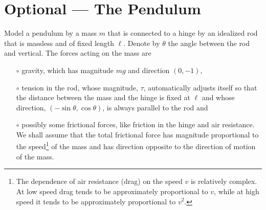 \section{Optional --- The Pendulum}\label{sec:Pendulum}

Model a pendulum by a mass $m$ that is connected to a hinge by 
an idealized rod that is massless and of fixed length $\ell$. Denote 
by $\theta$ the angle
between the rod and vertical. The forces acting on the mass are
\begin{itemize}\itemsep1pt \parskip0pt  %
\item[$\circ$]
gravity, which has magnitude $mg$ and direction $(0,-1)$, 
\item[$\circ$]
tension in the rod, whose magnitude, $\tau$, automatically adjusts 
itself so that the distance between the mass and the hinge is 
fixed at $\ell$ and whose direction,
$(-\sin\theta,\cos\theta)$, is always parallel to the rod and 
\item[$\circ$]
possibly some frictional forces, like friction in the hinge and 
air resistance. We shall assume that the total frictional force 
has magnitude proportional to the speed\footnote{The dependence of air resistance (drag) on the speed $v$ is relatively complex. At low speed 
drag tends to be approximately proportional to $v$, while at high speed 
it tends to be approximately proportional to $v^2$.} of the 
mass and has direction opposite to the direction of motion of the mass.
\end{itemize}
